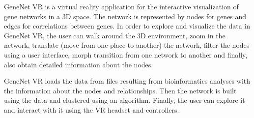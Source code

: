 %
%



GeneNet VR is a virtual reality application for the interactive visualization of gene networks in a 3D space. The network is represented by nodes for genes and edges for correlations between genes. In order to explore and visualize the data in GeneNet VR, the user can walk around the 3D environment, zoom in the network, translate (move from one place to another) the network, filter the nodes using a user interface, morph transition from one network to another and finally, also obtain detailed information about the nodes.

GeneNet VR loads the data from files resulting from bioinformatics analyses with the information about the nodes and relationships. Then the network is built using the data and clustered using an algorithm. Finally, the user can explore it and interact with it using the VR headset and controllers.

